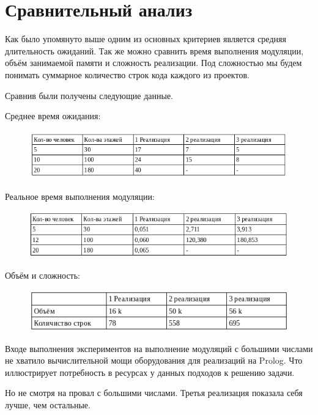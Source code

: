 \section{ Сравнительный анализ}

	Как было упомянуто выше одним из основных критериев является средняя длительность ожиданий.
		Так же можно сравнить время выполнения модуляции, объём занимаемой памяти и сложность реализации.
		Под сложностью мы будем понимать суммарное количество строк кода каждого из проектов.

	Сравнив были получены следующие данные.

		Среднее время ожидания:
			\begin{figure}[!htb]
					\includegraphics[width=\linewidth]{src/1.png}
					\centering
			\end{figure}

		Реальное время выполнения модуляции:
			\begin{figure}[!htb]
					\includegraphics[width=\linewidth]{src/2.png}
					\centering
			\end{figure}

		Объём и сложность:
			\begin{figure}[!htb]
					\includegraphics[width=\linewidth]{src/3.png}
					\centering
			\end{figure}

		Входе выполнения экспериментов на выполнение модуляций с большими числами не хватило вычислительной мощи
		оборудования для реализаций на Prolog. Что иллюстрирует потребность в ресурсах у данных подходов
		к решению задачи.

		Но не смотря на провал с большими числами. Третья реализация показала себя лучше, чем остальные.
